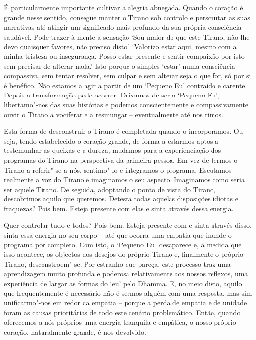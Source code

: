 É particularmente importante cultivar a alegria abnegada. Quando o coração é
grande nesse sentido, consegue manter o Tirano sob controlo e perscrutar as suas
narrativas até atingir um significado mais profundo da sua própria consciência
saudável. Pode trazer à mente a sensação `Sou maior do que este Tirano, não lhe
devo quaisquer favores, não preciso disto.' `Valorizo estar aqui, mesmo com a
minha tristeza ou insegurança. Posso estar presente e sentir compaixão por isto
sem precisar de alterar nada.' Isto porque o simples `estar' numa consciência
compassiva, sem tentar resolver, sem culpar e sem alterar seja o que for, só por
si é benéfico. Não estamos a agir a partir de um `Pequeno Eu' contraído e
carente. Depois a transformação pode ocorrer. Deixamos de ser o `Pequeno Eu',
libertamo"-nos das suas histórias e podemos conscientemente e compassivamente
ouvir o Tirano a vociferar e a resmungar -- eventualmente até nos rimos.

Esta forma de desconstruir o Tirano é completada quando o incorporamos. Ou seja,
tendo estabelecido o coração grande, de forma a estarmos aptos a testemunhar as
queixas e a dureza, mudamos para a experienciação dos programas do Tirano na
perspectiva da primeira pessoa. Em vez de termos o Tirano a referir"-se a nós,
sentimo"-lo e integramos o programa. Escutamos realmente a voz do Tirano e
imaginamos o seu aspecto. Imaginamos como seria ser aquele Tirano. De seguida,
adoptando o ponto de vista do Tirano, descobrimos aquilo que queremos. Detesta
todas aquelas disposições idiotas e fraquezas? Pois bem. Esteja presente com
elas e sinta através dessa energia.

Quer controlar tudo e todos? Pois bem. Esteja presente com e sinta através
disso, sinta essa energia no seu corpo -- até que ocorra uma empatia que inunde
o programa por completo. Com isto, o `Pequeno Eu' desaparece e, à medida que
isso acontece, os objectos dos desejos do próprio Tirano e, finalmente o próprio
Tirano, desconstroem"-se. Por estranho que pareça, este processo traz uma
aprendizagem muito profunda e poderosa relativamente aos nossos reflexos, uma
experiência de largar as formas do `eu' pelo Dhamma. E, no meio disto, aquilo
que frequentemente é necessário não é sermos alguém com uma resposta, mas sim
unificarmo"-nos em redor da empatia -- porque a perda de empatia e de unidade
foram as causas prioritárias de todo este cenário problemático. Então, quando
oferecemos a nós próprios uma energia tranquila e empática, o nosso próprio
coração, naturalmente grande, é-nos devolvido.

